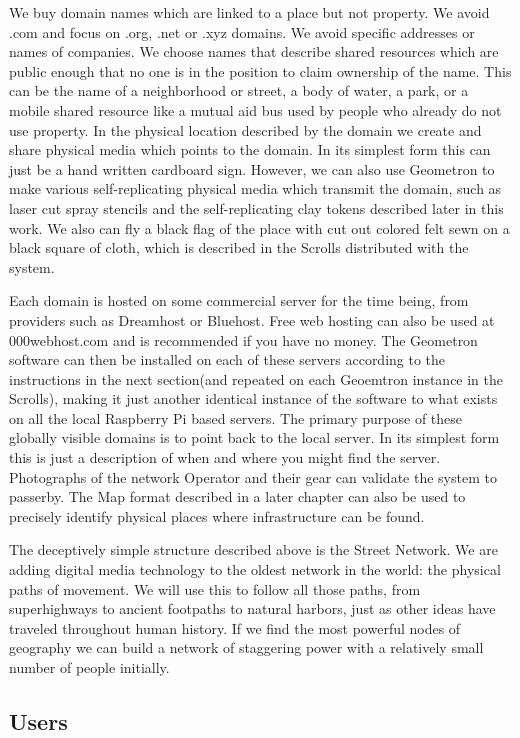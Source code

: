 \documentclass{report}
\begin{document}
We buy domain names which are linked to a place but not property. We
avoid .com and focus on .org, .net or .xyz domains. We avoid specific
addresses or names of companies. We choose names that describe shared
resources which are public enough that no one is in the position to
claim ownership of the name. This can be the name of a neighborhood or
street, a body of water, a park, or a mobile shared resource like a
mutual aid bus used by people who already do not use property. In the
physical location described by the domain we create and share physical
media which points to the domain. In its simplest form this can just be
a hand written cardboard sign. However, we can also use Geometron to
make various self-replicating physical media which transmit the domain,
such as laser cut spray stencils and the self-replicating clay tokens
described later in this work. We also can fly a black flag of the place
with cut out colored felt sewn on a black square of cloth, which is
described in the Scrolls distributed with the system.

Each domain is hosted on some commercial server for the time being, from
providers such as Dreamhost or Bluehost. Free web hosting can also be
used at 000webhost.com and is recommended if you have no money. The
Geometron software can then be installed on each of these servers
according to the instructions in the next section(and repeated on each
Geoemtron instance in the Scrolls), making it just another identical
instance of the software to what exists on all the local Raspberry Pi
based servers. The primary purpose of these globally visible domains is
to point back to the local server. In its simplest form this is just a
description of when and where you might find the server. Photographs of
the network Operator and their gear can validate the system to passerby.
The Map format described in a later chapter can also be used to
precisely identify physical places where infrastructure can be found.

The deceptively simple structure described above is the Street Network.
We are adding digital media technology to the oldest network in the
world: the physical paths of movement. We will use this to follow all
those paths, from superhighways to ancient footpaths to natural harbors,
just as other ideas have traveled throughout human history. If we find
the most powerful nodes of geography we can build a network of
staggering power with a relatively small number of people initially.

\hypertarget{users}{%
\subsection{Users}\label{users}}
\end{document}
